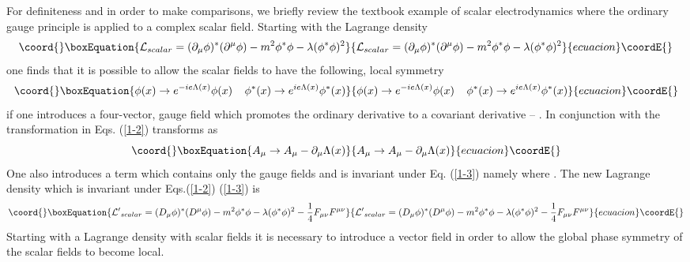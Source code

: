 \documentclass[a4paper,aps]{revtex4}
\begin{document}
For definiteness and in order to make comparisons, we briefly
review the textbook example \cite{ryder} of scalar electrodynamics
where the ordinary gauge principle is applied to a complex scalar
field. Starting with the Lagrange density
\begin{equation}\coord{}\boxEquation{
\label{1-1}
{\cal L}_{scalar} = (\partial _{\mu} \phi) ^{\ast} (\partial ^{\mu} \phi)
-m^2 \phi ^{\ast} \phi - \lambda (\phi ^{\ast} \phi)^2
}{
{\cal L}_{scalar} = (\partial _{\mu} \phi) ^{\ast} (\partial ^{\mu} \phi)
-m^2 \phi ^{\ast} \phi - \lambda (\phi ^{\ast} \phi)^2
}{ecuacion}\coordE{}\end{equation}
one finds that it is possible to allow the scalar fields to have
the following, local symmetry
\begin{equation}\coord{}\boxEquation{
\label{1-2}
\phi (x) \rightarrow e^{-ie \Lambda (x)} \phi (x)
\; \; \; \;
\phi ^{\ast} (x) \rightarrow e^{ie \Lambda (x)} \phi ^{\ast} (x)
}{
\phi (x) \rightarrow e^{-ie \Lambda (x)} \phi (x)
\; \; \; \;
\phi ^{\ast} (x) \rightarrow e^{ie \Lambda (x)} \phi ^{\ast} (x)
}{ecuacion}\coordE{}\end{equation}
if one introduces a four-vector, gauge field \coordHE{} which
promotes the ordinary derivative to a covariant derivative --
\coordHE{}.
In conjunction with the transformation in Eqs. (\ref{1-2})
\coordHE{} transforms as
\begin{equation}\coord{}\boxEquation{
\label{1-3}
A_{\mu} \rightarrow A_{\mu} -\partial _{\mu} \Lambda (x)
}{
A_{\mu} \rightarrow A_{\mu} -\partial _{\mu} \Lambda (x)
}{ecuacion}\coordE{}\end{equation}
One also introduces a term which contains only the gauge
fields and is invariant under Eq. (\ref{1-3}) namely
\coordHE{} where
\coordHE{}.
The new Lagrange density which is invariant under
Eqs.(\ref{1-2}) (\ref{1-3}) is
\begin{equation}\coord{}\boxEquation{
\label{1-4}
{\cal L'}_{scalar} = (D_{\mu} \phi) ^{\ast} (D ^{\mu} \phi)
-m^2 \phi ^{\ast} \phi - \lambda (\phi ^{\ast} \phi)^2
-\frac{1}{4} F_{\mu \nu} F^{\mu \nu}
}{
{\cal L'}_{scalar} = (D_{\mu} \phi) ^{\ast} (D ^{\mu} \phi)
-m^2 \phi ^{\ast} \phi - \lambda (\phi ^{\ast} \phi)^2
-\frac{1}{4} F_{\mu \nu} F^{\mu \nu}
}{ecuacion}\coordE{}\end{equation}
Starting with a Lagrange density with scalar
fields it is necessary to introduce a vector field
in order to allow the global phase symmetry of the scalar
fields to become local. 
\end{document}
